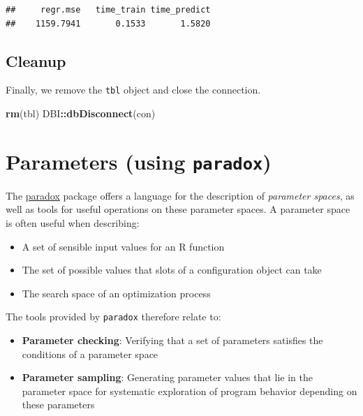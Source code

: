 \documentclass[]{scrbook}
\newenvironment{Shaded}{\begin{snugshade}}{\end{snugshade}}
\newcommand{\KeywordTok}[1]{\textcolor[rgb]{0.13,0.29,0.53}{\textbf{#1}}}
\newcommand{\NormalTok}[1]{#1}
\newcommand{\OperatorTok}[1]{\textcolor[rgb]{0.81,0.36,0.00}{\textbf{#1}}}
\providecommand{\tightlist}{%
  \setlength{\itemsep}{0pt}\setlength{\parskip}{0pt}}
\renewenvironment{Shaded} {\begin{snugshade}\small} {\end{snugshade}}
\begin{document}
\begin{verbatim}
##     regr.mse   time_train time_predict 
##    1159.7941       0.1533       1.5820
\end{verbatim}

\hypertarget{cleanup}{%
\subsection{Cleanup}\label{cleanup}}

Finally, we remove the \texttt{tbl} object and close the connection.

\begin{Shaded}
\begin{Highlighting}[]
\KeywordTok{rm}\NormalTok{(tbl)}
\NormalTok{DBI}\OperatorTok{::}\KeywordTok{dbDisconnect}\NormalTok{(con)}
\end{Highlighting}
\end{Shaded}

\hypertarget{paradox}{%
\section{\texorpdfstring{Parameters (using \texttt{paradox})}{Parameters (using paradox)}}\label{paradox}}

The \href{https://paradox.mlr-org.com}{paradox} package offers a language for the description of \emph{parameter spaces}, as well as tools for useful operations on these parameter spaces.
A parameter space is often useful when describing:

\begin{itemize}
\tightlist
\item
  A set of sensible input values for an R function
\item
  The set of possible values that slots of a configuration object can take
\item
  The search space of an optimization process
\end{itemize}

The tools provided by \texttt{paradox} therefore relate to:

\begin{itemize}
\tightlist
\item
  \textbf{Parameter checking}: Verifying that a set of parameters satisfies the conditions of a parameter space
\item
  \textbf{Parameter sampling}: Generating parameter values that lie in the parameter space for systematic exploration of program behavior depending on these parameters
\end{itemize}
\end{document}
